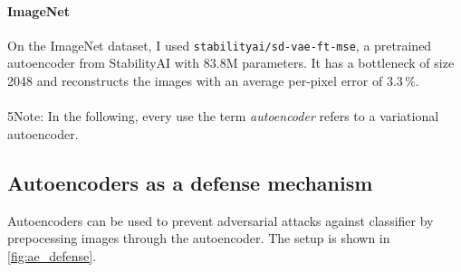 \documentclass[]{scrarticle}
\renewcommand{\todo}[1]{}
\begin{document}

\paragraph{ImageNet}
On the ImageNet dataset, I used \texttt{stabilityai/sd-vae-ft-mse}, a pretrained autoencoder from StabilityAI
\cite{stabilityai_sdvaeftmse} with $83.8\text{M}$ parameters.
It has a bottleneck of size 2048 and reconstructs the images with an average per-pixel error of $3.3\,\%$.


\paragraph{}5Note: In the following, every use the term \textit{autoencoder}
refers to a variational autoencoder.




\subsection{Autoencoders as a defense mechanism}
Autoencoders can be used to prevent adversarial attacks
against classifier by prepocessing images through the autoencoder.
The setup is shown in \autoref{fig:ae_defense}.
\end{document}
